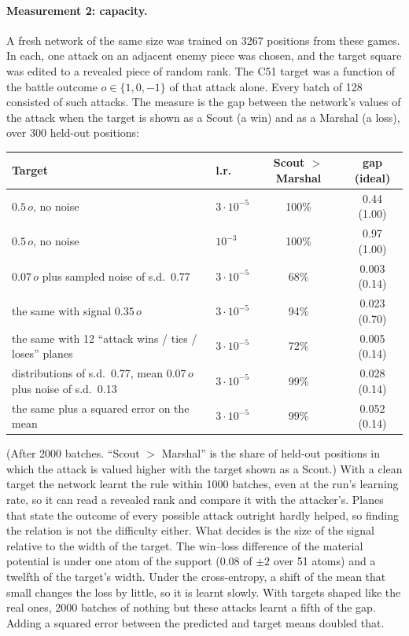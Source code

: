 \paragraph{Measurement 2: capacity.} A fresh network of the same size was trained on 3267
positions from these games. In each, one attack on an adjacent enemy piece was chosen, and the
target square was edited to a revealed piece of random rank. The C51 target was a function of
the battle outcome $o \in \{1, 0, -1\}$ of that attack alone. Every batch of 128 consisted of such
attacks. The measure is the gap between the network's values of the attack when the target is
shown as a Scout (a win) and as a Marshal (a loss), over 300 held-out positions:
\begin{center}
\small
\begin{tabular}{p{7.2cm}lcc}
\toprule
Target & l.r. & Scout $>$ Marshal & gap (ideal) \\
\midrule
$0.5\,o$, no noise & $3\cdot 10^{-5}$ & 100\% & 0.44 (1.00) \\
$0.5\,o$, no noise & $10^{-3}$ & 100\% & 0.97 (1.00) \\
$0.07\,o$ plus sampled noise of s.d.\ 0.77 & $3\cdot 10^{-5}$ & 68\% & 0.003 (0.14) \\
\quad the same with signal $0.35\,o$ & $3\cdot 10^{-5}$ & 94\% & 0.023 (0.70) \\
\quad the same with 12 ``attack wins / ties / loses'' planes & $3\cdot 10^{-5}$ & 72\% & 0.005 (0.14) \\
distributions of s.d.\ 0.77, mean $0.07\,o$ plus noise of s.d.\ 0.13 & $3\cdot 10^{-5}$ & 99\% & 0.028 (0.14) \\
\quad the same plus a squared error on the mean & $3\cdot 10^{-5}$ & 99\% & 0.052 (0.14) \\
\bottomrule
\end{tabular}
\end{center}
(After 2000 batches. ``Scout $>$ Marshal'' is the share of held-out positions in which the attack
is valued higher with the target shown as a Scout.) With a clean target the network learnt the
rule within 1000 batches, even at the run's learning
rate, so it can read a revealed rank and compare it with the attacker's. Planes that state the
outcome of every possible attack outright hardly helped, so finding the relation is not the
difficulty either. What decides is the size of the signal relative to the width of the target. The
win--loss difference of the material potential is under one atom of the support (0.08 of $\pm 2$
over 51 atoms) and a twelfth of the target's width. Under the cross-entropy, a shift of the mean
that small changes the loss by little, so it is learnt slowly. With targets shaped like the real
ones, 2000 batches of nothing but these attacks learnt a fifth of the gap. Adding a squared error
between the predicted and target means doubled that.

